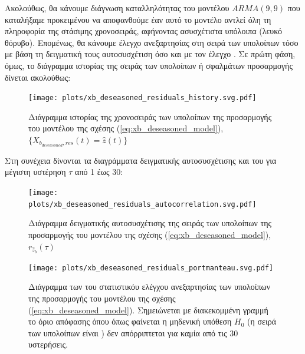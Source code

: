Ακολούθως, θα κάνουμε διάγνωση καταλληλότητας του μοντέλου $ARMA(9,9)$ που καταλήξαμε προκειμένου να αποφανθούμε έαν αυτό το μοντέλο αντλεί όλη τη πληροφορία της στάσιμης χρονοσειράς, αφήνοντας ασυσχέτιστα υπόλοιπα (λευκό θόρυβο). Επομένως, θα κάνουμε έλεγχο ανεξαρτησίας στη σειρά των υπολοίπων τόσο με βάση τη δειγματική τους αυτοσυσχέτιση όσο και με τον έλεγχο . Σε πρώτη φάση, όμως, το διάγραμμα ιστορίας της σειράς των υπολοίπων ή σφαλμάτων προσαρμογής δίνεται ακολούθως:

\begin{figure}[H]
    \begin{center}
        \texttt{[image: plots/xb\_deseasoned\_residuals\_history.svg.pdf]}
        \caption{Διάγραμμα ιστορίας της χρονοσειράς των υπολοίπων της προσαρμογής του μοντέλου της σχέσης (\ref{eq:xb_deseasoned_model}), $\{X_{b_{deseasoned},res}(t) = \hat{z}(t)\}$}
        \label{fig:xb_deseasoned_residuals_history}
    \end{center}
\end{figure}

Στη συνέχεια δίνονται τα διαγράμματα δειγματικής αυτοσυσχέτισης και  του  για μέγιστη υστέρηση $\tau$ από 1 έως 30:

\begin{figure}[H]
    \begin{center}
        \texttt{[image: plots/xb\_deseasoned\_residuals\_autocorrelation.svg.pdf]}
        \caption{Διάγραμμα δειγματικής αυτοσυσχέτισης της σειράς των υπολοίπων της προσαρμογής του μοντέλου της σχέσης (\ref{eq:xb_deseasoned_model}), $r_{\hat{z}_b}(\tau)$}
        \label{fig:xb_deseasoned_residuals_autocorrelation}
    \end{center}
\end{figure}

\begin{figure}[H]
    \begin{center}
        \texttt{[image: plots/xb\_deseasoned\_residuals\_portmanteau.svg.pdf]}
        \caption{Διάγραμμα των  του στατιστικόυ ελέγχου ανεξαρτησίας  των υπολοίπων της προσαρμογής του μοντέλου της σχέσης (\ref{eq:xb_deseasoned_model}). Σημειώνεται με διακεκομμένη γραμμή το όριο απόφασης όπου όπως φαίνεται η μηδενική υπόθεση $H_0$ (η σειρά των υπολοίπων είναι ) δεν απόρριπτεται για καμία από τις 30 υστερήσεις.}
        \label{fig:xb_deseasoned_residuals_portmanteau}
    \end{center}
\end{figure}

